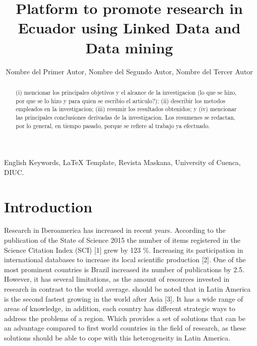 \documentclass[11pt]{article}
\title{Platform to promote research in Ecuador using Linked Data and Data mining}
\author{Nombre del Primer Autor\inst{1}, Nombre del Segundo Autor\inst{2}, Nombre del Tercer Autor\inst{1,3} }
\begin{document}
 


\renewcommand{\refname}{Referencias}
\renewcommand{\tablename}{Tabla}
\renewcommand{\figurename}{Figura}

\maketitle

\begin{abstract}
(i) mencionar los principales objetivos y el alcance de la investigacion (lo que se hizo, por que se lo hizo y para quien se escribio el articulo?); (ii) describir los metodos empleados en la investigacion; (iii) resumir los resultados obtenidos; y (iv) mencionar las principales conclusiones derivadas de la investigacion. Los resumenes se redactan, por lo general, en tiempo pasado, porque se refiere al trabajo ya efectuado.
\end{abstract}

\begin{keywords}
English Keywords, \LaTeX{} Template, Revista Maskana, University of Cuenca, DIUC.
\end{keywords}


\section{Introduction}
\label{sec:Intro}

Research in Iberoamerica has increased in recent years. According to the publication of the State of Science 2015 the number of items registered in the Science Citation Index (SCI) [1] grew by 123 \%. Increasing its participation in international databases to increase its local scientific production [2]. One of the most prominent countries is Brazil increased its number of publications by 2.5. However, it has several limitations, as the amount of resources invested in research in contrast to the world average. should be noted that in Latin America is the second fastest growing in the world after Asia [3]. It has a wide range of areas of knowledge, in addition, each country has different strategic ways to address the problems of a region. Which provides a set of solutions that can be an advantage compared to first world countries in the field of research, as these solutions should be able to cope with this heterogeneity in Latin America. 
\end{document}
